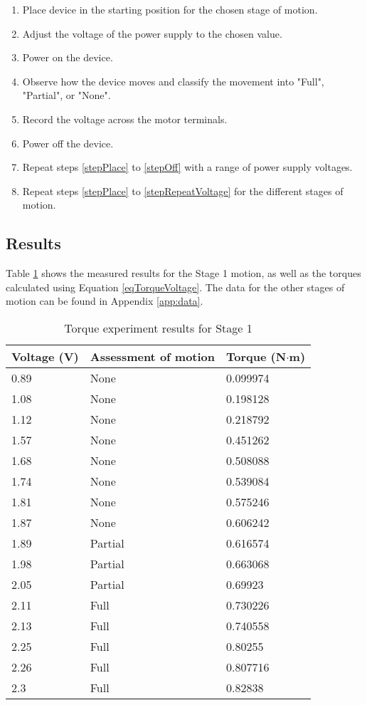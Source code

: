 \begin{enumerate}
	\item Place device in the starting position for the chosen stage of motion. \label{stepPlace}
	\item Adjust the voltage of the power supply to the chosen value.
	\item Power on the device.
	\item Observe how the device moves and classify the movement into "Full", "Partial", or "None". 
	\item Record the voltage across the motor terminals. 
	\item Power off the device.\label{stepOff}
	\item Repeat steps \ref{stepPlace} to \ref{stepOff} with a range of power supply voltages.\label{stepRepeatVoltage}
	\item Repeat steps \ref{stepPlace} to \ref{stepRepeatVoltage} for the different stages of motion.
\end{enumerate}

\subsection{Results}

Table \ref{tab:Stage1Torque} shows the measured results for the Stage 1 motion, as well as the torques calculated using Equation \ref{eqTorqueVoltage}. The data for the other stages of motion can be found in Appendix \ref{app:data}.

\begin{table}[!h]
	\centering
	\caption{Torque experiment results for Stage 1}
	\label{tab:Stage1Torque}
	\begin{tabular}{|l|l|l|}
		\hline
		Voltage (V) & Assessment of motion & Torque (N$\cdot$m) \\ \hline
		0.89 & None & 0.099974 \\ \hline
		1.08 & None & 0.198128 \\ \hline
		1.12 & None & 0.218792 \\ \hline
		1.57 & None & 0.451262 \\ \hline
		1.68 & None & 0.508088 \\ \hline
		1.74 & None & 0.539084 \\ \hline
		1.81 & None & 0.575246 \\ \hline
		1.87 & None & 0.606242 \\ \hline
		1.89 & Partial & 0.616574 \\ \hline
		1.98 & Partial & 0.663068 \\ \hline
		2.05 & Partial & 0.69923 \\ \hline
		2.11 & Full & 0.730226 \\ \hline
		2.13 & Full & 0.740558 \\ \hline
		2.25 & Full & 0.80255 \\ \hline
		2.26 & Full & 0.807716 \\ \hline
		2.3 & Full & 0.82838 \\ \hline
	\end{tabular}
\end{table}

